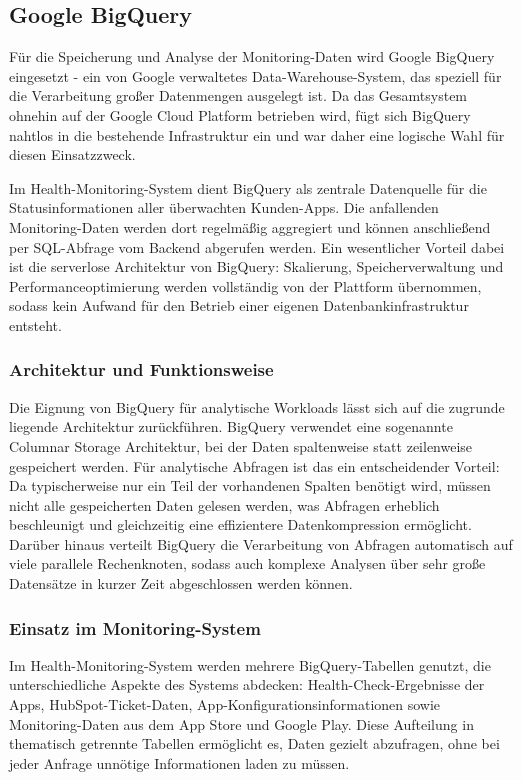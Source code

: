 \subsection{Google BigQuery}
Für die Speicherung und Analyse der Monitoring-Daten wird Google BigQuery eingesetzt - ein von Google verwaltetes Data-Warehouse-System, das speziell für die Verarbeitung großer Datenmengen ausgelegt ist. Da das Gesamtsystem ohnehin auf der Google Cloud Platform betrieben wird, fügt sich BigQuery nahtlos in die bestehende Infrastruktur ein und war daher eine logische Wahl für diesen Einsatzzweck.

Im Health-Monitoring-System dient BigQuery als zentrale Datenquelle für die Statusinformationen aller überwachten Kunden-Apps. Die anfallenden Monitoring-Daten werden dort regelmäßig aggregiert und können anschließend per SQL-Abfrage vom Backend abgerufen werden. Ein wesentlicher Vorteil dabei ist die serverlose Architektur von BigQuery: Skalierung, Speicherverwaltung und Performanceoptimierung werden vollständig von der Plattform übernommen, sodass kein Aufwand für den Betrieb einer eigenen Datenbankinfrastruktur entsteht. \cite{bigquery_docs}

\subsubsection{Architektur und Funktionsweise} 
Die Eignung von BigQuery für analytische Workloads lässt sich auf die zugrunde liegende Architektur zurückführen. BigQuery verwendet eine sogenannte Columnar Storage Architektur, bei der Daten spaltenweise statt zeilenweise gespeichert werden. \cite{bigquery_paper} Für analytische Abfragen ist das ein entscheidender Vorteil: Da typischerweise nur ein Teil der vorhandenen Spalten benötigt wird, müssen nicht alle gespeicherten Daten gelesen werden, was Abfragen erheblich beschleunigt und gleichzeitig eine effizientere Datenkompression ermöglicht. Darüber hinaus verteilt BigQuery die Verarbeitung von Abfragen automatisch auf viele parallele Rechenknoten, sodass auch komplexe Analysen über sehr große Datensätze in kurzer Zeit abgeschlossen werden können.

\subsubsection{Einsatz im Monitoring-System}
Im Health-Monitoring-System werden mehrere BigQuery-Tabellen genutzt, die unterschiedliche Aspekte des Systems abdecken: Health-Check-Ergebnisse der Apps, HubSpot-Ticket-Daten, App-Konfigurationsinformationen sowie Monitoring-Daten aus dem App Store und Google Play. Diese Aufteilung in thematisch getrennte Tabellen ermöglicht es, Daten gezielt abzufragen, ohne bei jeder Anfrage unnötige Informationen laden zu müssen.

